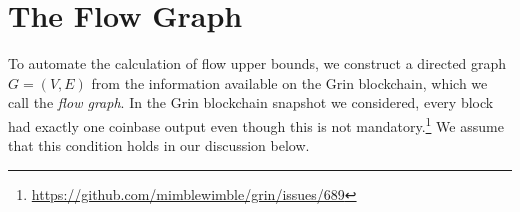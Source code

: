 

\section{The Flow Graph}
\label{scn:FlowGraph}

To automate the calculation of flow upper bounds, we construct a directed graph $G = (V, E)$ from the information available on the Grin blockchain, which we call the \textit{flow graph}. In the Grin blockchain snapshot we considered, every block had exactly one coinbase output even though this is not mandatory.\footnote{\url{https://github.com/mimblewimble/grin/issues/689}} We assume that this condition holds in our discussion below. 


